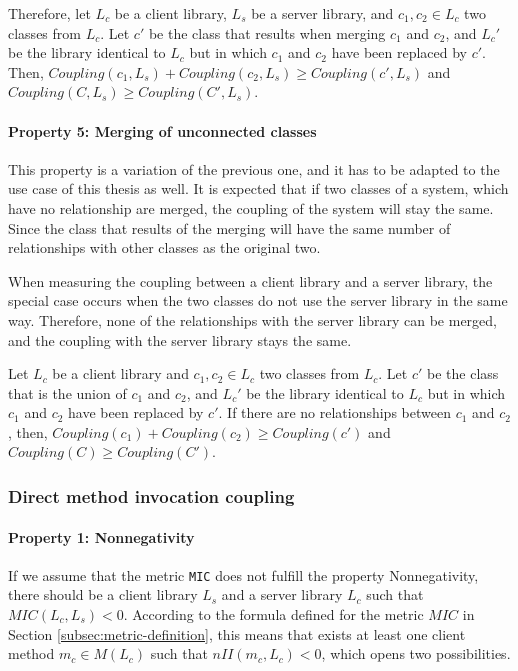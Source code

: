 Therefore, let $L_c$ be a client library, $L_s$ be a server library, and $c_1, c_2 \in L_c$ two classes from $L_c$. Let $c'$ be the class that results when merging  $c_1$ and $c_2$, and $L_c'$ be the library identical to $L_c$ but in which $c_1$ and $c_2$ have been replaced by $c'$. Then, $Coupling(c_1, L_s) + Coupling(c_2, L_s) \ge Coupling(c', L_s)$ and $Coupling(C, L_s) \ge Coupling(C', L_s)$.

\paragraph{Property 5: Merging of unconnected classes}
This property is a variation of the previous one, and it has to be adapted to the use case of this thesis as well. It is expected that if two classes of a system, which have no relationship are merged, the coupling of the system will stay the same. Since the class that results of the merging will have the same number of relationships with other classes as the original two.

When measuring the coupling between a client library and a server library, the special case occurs when the two classes do not use the server library in the same way. Therefore, none of the relationships with the server library can be merged, and the coupling with the server library stays the same.

Let $L_c$ be a client library and $c_1, c_2 \in L_c$ two classes from $L_c$. Let $c'$ be the class that is the union of  $c_1$ and $c_2$, and $L_c'$ be the library identical to $L_c$ but in which $c_1$ and $c_2$ have been replaced by $c'$. If there are no relationships between $c_1$ and $c_2$, then, $Coupling(c_1) + Coupling(c_2) \ge Coupling(c')$ and $Coupling(C) \ge Coupling(C')$.

\subsubsection{Direct method invocation coupling}

\paragraph{Property 1: Nonnegativity}
If we assume that the metric \texttt{MIC} does not fulfill the property Nonnegativity, there should be a client library $L_s$ and a server library $L_c$ such that $MIC(L_c, L_s) < 0$.
According to the formula defined for the metric $MIC$ in Section \ref{subsec:metric-definition}, this means that exists at least one client method $m_c \in M(L_c)$ such that $nII(m_c, L_c) < 0$, which opens two possibilities.

